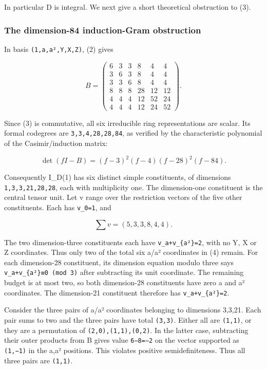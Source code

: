 In particular D is integral. We next give a short theoretical
obstruction to (3).

\hypertarget{the-dimension-84-induction-gram-obstruction}{%
\subsubsection{The dimension-84 induction-Gram
obstruction}\label{the-dimension-84-induction-gram-obstruction}}

In basis \texttt{(1,a,a\allowbreak{}²,Y,X,\allowbreak{}Z)}, (2) gives

\[
B=\begin{pmatrix}
6&3&3&8&4&4\\
3&6&3&8&4&4\\
3&3&6&8&4&4\\
8&8&8&28&12&12\\
4&4&4&12&52&24\\
4&4&4&12&24&52
\end{pmatrix}.
\]

Since (3) is commutative, all six irreducible ring representations are
scalar. Its formal codegrees are
\texttt{3,3,4,\allowbreak{}28,28,\allowbreak{}84}, as verified by the
characteristic polynomial of the Casimir/induction matrix:

\[
\det(fI-B)=(f-3)^2(f-4)(f-28)^2(f-84).
\]

Consequently I\_D(1) has six distinct simple constituents, of dimensions
\texttt{1,3,3,\allowbreak{}21,28,\allowbreak{}28}, each with
multiplicity one. The dimension-one constituent is the central tensor
unit. Let v range over the restriction vectors of the five other
constituents. Each has \texttt{v\_\allowbreak{}0=1}, and

\[
\sum v=(5,3,3,8,4,4). \tag{4}
\]

The two dimension-three constituents each have
\texttt{v\_\allowbreak{}a+v\_\allowbreak{}\{a²\}=2\allowbreak{}}, with
no Y, X or Z coordinates. Thus only two of the total six a/a²
coordinates in (4) remain. For each dimension-28 constituent, its
dimension equation modulo three says
\texttt{v\_\allowbreak{}a+v\_\allowbreak{}\{a²\}≡0\allowbreak{} (mod \allowbreak{}3)}
after subtracting its unit coordinate. The remaining budget is at most
two, so both dimension-28 constituents have zero a and a² coordinates.
The dimension-21 constituent therefore has
\texttt{v\_\allowbreak{}a+v\_\allowbreak{}\{a²\}=2\allowbreak{}}.

Consider the three pairs of a/a² coordinates belonging to dimensions
3,3,21. Each pair sums to two and the three pairs have total
\texttt{(3,3)}. Either all are \texttt{(1,1)}, or they are a permutation
of \texttt{(2,0),\allowbreak{}(1,1),\allowbreak{}(0,2)}. In the latter
case, subtracting their outer products from B gives value
\texttt{6−8=−2\allowbreak{}} on the vector supported as
\texttt{(1,−1)\allowbreak{}} in the a,a² positions. This violates
positive semidefiniteness. Thus all three pairs are \texttt{(1,1)}.

